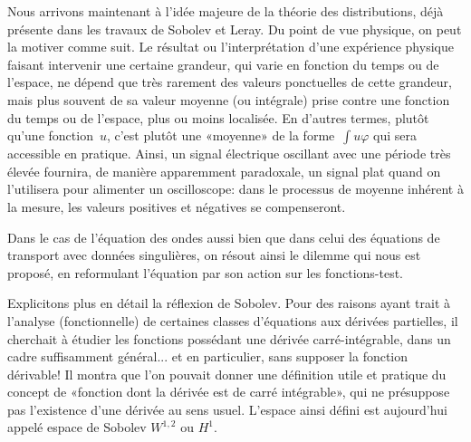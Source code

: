\begin{histoire}
Nous arrivons maintenant à l'idée majeure de la théorie des distributions, déjà présente dans les travaux de Sobolev et Leray. Du point de vue physique, on peut la motiver comme suit. Le résultat ou l'interprétation d'une expérience physique faisant intervenir une certaine grandeur, qui varie en fonction du temps ou de l'espace, ne dépend que très rarement des valeurs ponctuelles de cette grandeur, mais plus souvent de sa valeur moyenne (ou intégrale) prise contre une fonction du temps ou de l'espace, plus ou moins localisée. En d'autres termes, plutôt qu'une fonction~$u$, c'est plutôt une «moyenne» de la forme~$\int u\varphi$ qui sera accessible en pratique. Ainsi, un signal électrique oscillant avec une période très élevée fournira, de manière apparemment paradoxale, un signal plat quand on l'utilisera pour alimenter un oscilloscope: dans le processus de moyenne inhérent à la mesure, les valeurs positives et négatives se compenseront.

Dans le cas de l'équation des ondes aussi bien que dans celui des équations de transport avec données singulières, on résout ainsi le dilemme qui nous est proposé, en reformulant l'équation par son action sur les fonctions-test.

Explicitons plus en détail la réflexion de Sobolev. Pour des raisons ayant trait
à l'analyse (fonctionnelle) de certaines classes d'équations aux dérivées partielles,
il cherchait à étudier les fonctions possédant une dérivée carré-intégrable, dans un
cadre suffisamment général... et en particulier, sans supposer la fonction dérivable!
Il montra que l'on pouvait donner une définition utile et pratique du concept de «fonction dont la dérivée est de carré intégrable», qui ne présuppose pas l'existence d'une dérivée au sens usuel. L'espace ainsi défini est aujourd'hui appelé espace de Sobolev $W^{1,2}$ ou $H^1$.


\end{histoire}
